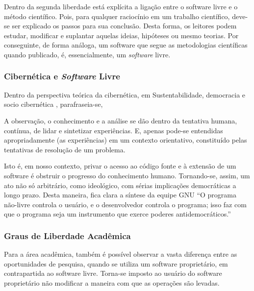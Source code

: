 \documentclass[12pt]{article}
\begin{document}

Dentro da segunda liberdade está explícita a ligação entre o software
livre e o método científico. Pois, para qualquer raciocínio em um
trabalho científico, deve-se ser explicado os passos para sua
conclusão. Desta forma, os leitores podem estudar, modificar e suplantar
aquelas ideias, hipóteses ou mesmo teorias. Por conseguinte, de forma
análoga, um software que segue as metodologias científicas quando
publicado, é, essencialmente, um \textit{software} livre.

\subsubsection{Cibernética e \textit{Software} Livre}
Dentro da perspectiva teórica da cibernética, em Sustentabilidade,
democracia e socio cibernética \cite{birrer1999}, parafraseia-se,

\begin{displayquote}
  A observação, o conhecimento e a análise se dão dentro da tentativa
  humana, contínua, de lidar e sintetizar experiências. E, apenas pode-se
  entendidas apropriadamente (as experiências) em um contexto orientativo, constituído
  pelas tentativas de resolução de um problema.
\end{displayquote}

Isto é, em nosso contexto, privar o acesso ao código fonte e à
extensão de um software é obstruir o progresso do conhecimento humano. Tornando-se, assim, um ato não só arbitrário, como
ideológico, com sérias implicações democráticas a longo prazo. Desta maneira, fica
clara a síntese da equipe GNU ``O programa não-livre controla o
usuário, e o desenvolvedor controla o programa; isso faz com que o
programa seja um instrumento que exerce poderes antidemocráticos.''  \cite{gnu1996}

\subsubsection{Graus de Liberdade Acadêmica}

Para a área acadêmica, também é possível observar a vasta diferença
entre as oportunidades de pesquisa, quando se utiliza um software
proprietário, em contrapartida ao software livre. Torna-se imposto ao
usuário do software proprietário não modificar a maneira com que as
operações são levadas.
\end{document}

